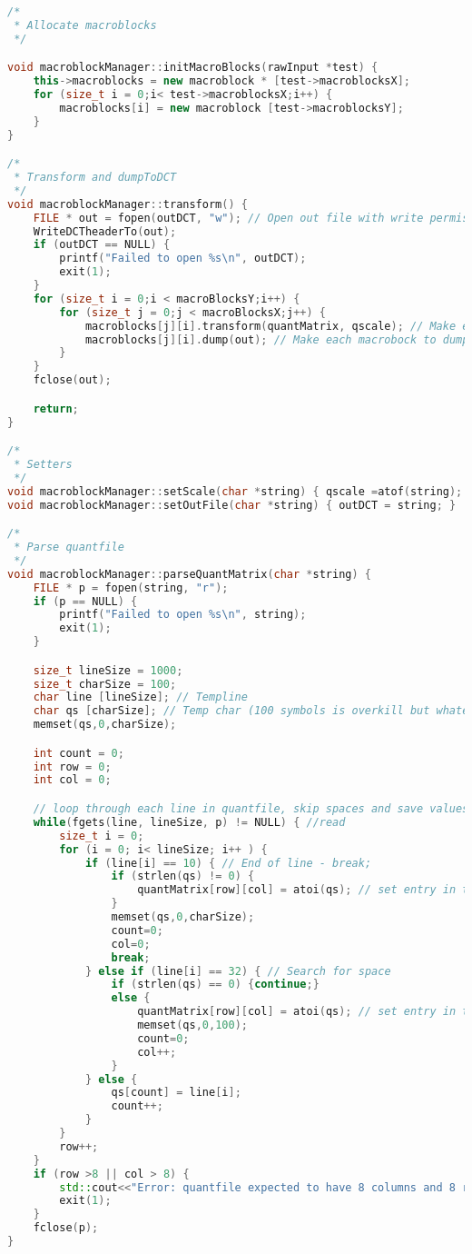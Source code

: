 \documentclass{report}
\begin{document}
\begin{lstlisting}[language=C++]
/*
 * Allocate macroblocks
 */

void macroblockManager::initMacroBlocks(rawInput *test) {
    this->macroblocks = new macroblock * [test->macroblocksX];
    for (size_t i = 0;i< test->macroblocksX;i++) {
        macroblocks[i] = new macroblock [test->macroblocksY];
    }
}

/*
 * Transform and dumpToDCT
 */
void macroblockManager::transform() {
    FILE * out = fopen(outDCT, "w"); // Open out file with write permissions (file will be overwritten)
    WriteDCTheaderTo(out);
    if (outDCT == NULL) {
        printf("Failed to open %s\n", outDCT);
        exit(1);
    }
    for (size_t i = 0;i < macroBlocksY;i++) {
        for (size_t j = 0;j < macroBlocksX;j++) {
            macroblocks[j][i].transform(quantMatrix, qscale); // Make each macrobock to transform itself
            macroblocks[j][i].dump(out); // Make each macrobock to dumpToDCT itself
        }
    }
    fclose(out);

    return;
}

/*
 * Setters
 */
void macroblockManager::setScale(char *string) { qscale =atof(string); }
void macroblockManager::setOutFile(char *string) { outDCT = string; }

/*
 * Parse quantfile
 */
void macroblockManager::parseQuantMatrix(char *string) {
    FILE * p = fopen(string, "r");
    if (p == NULL) {
        printf("Failed to open %s\n", string);
        exit(1);
    }

    size_t lineSize = 1000;
    size_t charSize = 100;
    char line [lineSize]; // Templine
    char qs [charSize]; // Temp char (100 symbols is overkill but whatever)
    memset(qs,0,charSize);

    int count = 0;
    int row = 0;
    int col = 0;

    // loop through each line in quantfile, skip spaces and save values
    while(fgets(line, lineSize, p) != NULL) { //read
        size_t i = 0;
        for (i = 0; i< lineSize; i++ ) {
            if (line[i] == 10) { // End of line - break;
                if (strlen(qs) != 0) {
                    quantMatrix[row][col] = atoi(qs); // set entry in the matrix
                }
                memset(qs,0,charSize);
                count=0;
                col=0;
                break;
            } else if (line[i] == 32) { // Search for space
                if (strlen(qs) == 0) {continue;}
                else {
                    quantMatrix[row][col] = atoi(qs); // set entry in the matrix
                    memset(qs,0,100);
                    count=0;
                    col++;
                }
            } else {
                qs[count] = line[i];
                count++;
            }
        }
        row++;
    }
    if (row >8 || col > 8) {
        std::cout<<"Error: quantfile expected to have 8 columns and 8 rows\n";
        exit(1);
    }
    fclose(p);
}


\end{lstlisting}
\end{document}
